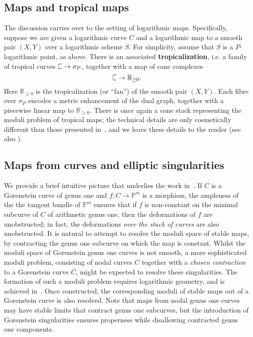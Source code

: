 \documentclass[11pt]{amsart}
\newcommand{\plC}{\scalebox{0.8}[1.3]{$\sqsubset$}}
\renewcommand{\to}{\rightarrow}
\newcommand{\RR}{\mathbb{R}}
\theoremstyle{definition}
\theoremstyle{definition}
\begin{document}
\subsection{Maps and tropical maps}The discussion carries over to the setting of logarithmic maps. Specifically, suppose we are given a logarithmic curve $C$ and a logarithmic map to a smooth pair $(X,Y)$ over a logarithmic scheme $S$. For simplicity, assume that $S$ is a $P$-logarithmic point, as above. There is an associated \textbf{tropicalization}, i.e. a family of tropical curves $\plC \to \sigma_P$, together with a map of cone complexes
\[
\plC\to \RR_{\geq 0}.
\]
Here $\RR_{\geq 0}$ is the tropicalization (or ``fan'') of the smooth pair $(X,Y)$. Each fibre over $\sigma_P$ encodes a metric enhancement of the dual graph, together with a piecewise linear map to $\RR_{\geq 0}$. There is once again a cone stack representing the moduli problem of tropical maps; the technical details are only cosmetically different than those presented in~\cite{CavalieriChanUlirschWise}, and we leave these details to the reader (see also \cite{GrossSiebertLog}).

\subsection{Maps from curves and elliptic singularities} We provide a brief intuitive picture that underlies the work in~\cite{RSPW,RSPW2}. If $C$ is a Gorenstein curve of genus one and $f:C\to \mathbb P^m$ is a morphism, the ampleness of the the tangent bundle of $\mathbb P^m$ ensures that if $f$ is non-constant on the minimal subcurve of $C$ of arithmetic genus one, then the deformations of $f$ are unobstructed; in fact, the deformations \textit{over the stack of curves} are also unobstructed. It is natural to attempt to resolve the moduli space of stable maps, by contracting the genus one subcurve on which the map is constant. Whilst the moduli space of Gorenstein genus one curves is not smooth, a more sophisticated moduli problem, consisting of nodal curves $C$ together with a \textit{chosen contraction} to a Gorenstein curve $\bar{C}$, might be expected to resolve these singularities. The formation of such a moduli problem requires logarithmic geometry, and is achieved in~\cite[Section~3]{RSPW}. Once constructed, the corresponding moduli of stable maps out of a Gorenstein curve is also resolved. Note that maps from nodal genus one curves may have stable limits that contract genus one subcurves, but the introduction of Gorenstein singularities ensures properness while disallowing contracted genus one components. 
\end{document}
